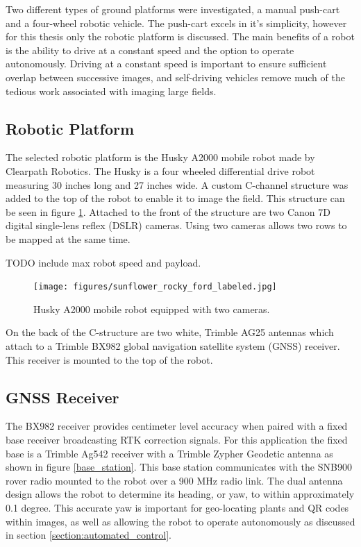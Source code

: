 Two different types of ground platforms were investigated, a manual push-cart and a four-wheel robotic vehicle.  The push-cart excels in it's simplicity, however for this thesis only the robotic platform is discussed.  The main benefits of a robot is the ability to drive at a constant speed and the option to operate autonomously.  Driving at a constant speed is important to ensure sufficient overlap between successive images, and self-driving vehicles remove much of the tedious work associated with imaging large fields.  

\subsection{Robotic Platform}

The selected robotic platform is the Husky A2000 mobile robot made by Clearpath Robotics.  The Husky is a four wheeled differential drive robot measuring 30 inches long and 27 inches wide. A custom C-channel structure was added to the top of the robot to enable it to image the field.  This structure can be seen in figure \ref{husky_rocky_ford}.  Attached to the front of the structure are two Canon 7D digital single-lens reflex (DSLR) cameras.  Using two cameras allows two rows to be mapped at the same time. 

TODO include max robot speed and payload.

\begin{figure}[htb]
	\centering
    \texttt{[image: figures/sunflower\_rocky\_ford\_labeled.jpg]}
    \caption[Husky]{Husky A2000 mobile robot equipped with two cameras.}
    \label{husky_rocky_ford}
\end{figure}

On the back of the C-structure are two white, Trimble AG25 antennas which attach to a Trimble BX982 global navigation satellite system (GNSS) receiver.  This receiver is mounted to the top of the robot.   

\subsection{GNSS Receiver}

The BX982 receiver provides centimeter level accuracy when paired with a fixed base receiver broadcasting RTK correction signals.  For this application the fixed base is a Trimble Ag542 receiver with a Trimble Zypher Geodetic antenna as shown in figure \ref{base_station}.  This base station communicates with the SNB900 rover radio mounted to the robot over a 900 MHz radio link.   The dual antenna design allows the robot to determine its heading, or yaw, to within approximately 0.1 degree.  This accurate yaw is important for geo-locating plants and QR codes within images, as well as allowing the robot to operate autonomously as discussed in section \ref{section:automated_control}. 

